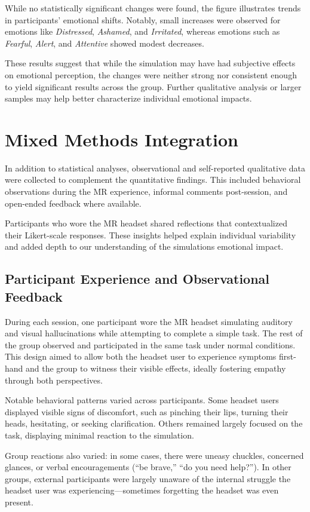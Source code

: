 While no statistically significant changes were found, the figure illustrates trends in participants’ emotional shifts. Notably, small increases were observed for emotions like \textit{Distressed}, \textit{Ashamed}, and \textit{Irritated}, whereas emotions such as \textit{Fearful}, \textit{Alert}, and \textit{Attentive} showed modest decreases.

These results suggest that while the simulation may have had subjective effects on emotional perception, the changes were neither strong nor consistent enough to yield significant results across the group. Further qualitative analysis or larger samples may help better characterize individual emotional impacts.


\section{Mixed Methods Integration}
In addition to statistical analyses, observational and self-reported qualitative data were collected to complement the quantitative findings. This included behavioral observations during the MR experience, informal comments post-session, and open-ended feedback where available.

Participants who wore the MR headset shared reflections that contextualized their Likert-scale responses. These insights helped explain individual variability and added depth to our understanding of the simulations emotional impact.


\subsection{Participant Experience and Observational Feedback}

During each session, one participant wore the MR headset simulating auditory and visual hallucinations while attempting to complete a simple task. The rest of the group observed and participated in the same task under normal conditions. This design aimed to allow both the headset user to experience symptoms first-hand and the group to witness their visible effects, ideally fostering empathy through both perspectives.

Notable behavioral patterns varied across participants. Some headset users displayed visible signs of discomfort, such as pinching their lips, turning their heads, hesitating, or seeking clarification. Others remained largely focused on the task, displaying minimal reaction to the simulation.

Group reactions also varied: in some cases, there were uneasy chuckles, concerned glances, or verbal encouragements (“be brave,” “do you need help?”). In other groups, external participants were largely unaware of the internal struggle the headset user was experiencing—sometimes forgetting the headset was even present.


